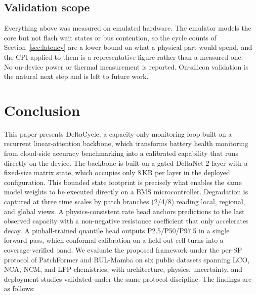 \documentclass[final,5p,times,twocolumn]{elsarticle}
\begin{document}
\subsection{Validation scope}
\label{sec:deploy_limits}

Everything above was measured on emulated hardware. The emulator models the
core but not flash wait states or bus contention, so the cycle counts of
Section~\ref{sec:latency} are a lower bound on what a physical part would
spend, and the CPI applied to them is a representative figure rather than a
measured one. No on-device power or thermal measurement is reported.
On-silicon validation is the natural next step and is left to future work.

\section{Conclusion}
\label{sec:conclusion}

This paper presents DeltaCycle, a capacity-only monitoring loop built on a recurrent linear-attention backbone, 
which transforms battery health monitoring from cloud-side accuracy benchmarking into a calibrated capability
that runs directly on the device. The backbone is built on a gated DeltaNet-2 layer with a fixed-size matrix state, 
which occupies only $8$\,KB per layer in the deployed configuration.
This bounded state footprint is precisely what enables the same model weights to be executed directly on a 
BMS microcontroller. Degradation is captured at three time scales by patch branches (2/4/8) reading local, regional, 
and global views. A physics-consistent rate head anchors predictions to the last observed capacity  with a 
non-negative resistance coefficient that only accelerates decay.  A pinball-trained quantile head outputs 
P2.5/P50/P97.5 in a single forward pass, which conformal calibration on a held-out cell turns into a coverage-verified band.
We evaluate the proposed framework under the per-SP protocol of PatchFormer and RUL-Mamba on six public datasets 
spanning LCO, NCA, NCM, and LFP chemistries, with architecture, physics, uncertainty, 
and deployment studies validated under the same protocol discipline. The findings
are as follows:
\end{document}
